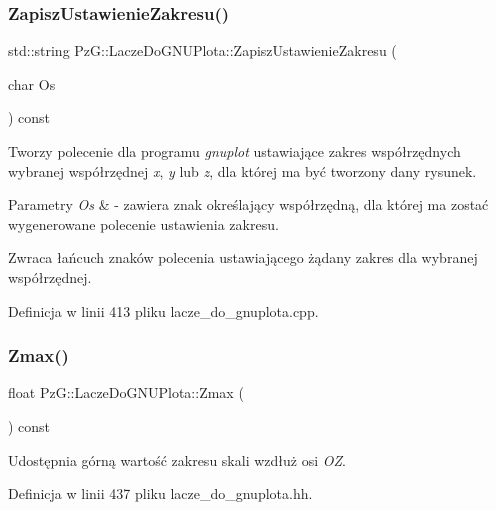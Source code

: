 \subsubsection{\texorpdfstring{ZapiszUstawienieZakresu()}{ZapiszUstawienieZakresu()}}
{\footnotesize\ttfamily std\+::string Pz\+G\+::\+Lacze\+Do\+G\+N\+U\+Plota\+::\+Zapisz\+Ustawienie\+Zakresu (\begin{DoxyParamCaption}\item[{char}]{Os }\end{DoxyParamCaption}) const\hspace{0.3cm}{\ttfamily [protected]}}

Tworzy polecenie dla programu {\itshape gnuplot} ustawiające zakres współrzędnych wybranej współrzędnej {\itshape x}, {\itshape y} lub {\itshape z}, dla której ma być tworzony dany rysunek. 
\begin{DoxyParams}{Parametry}
{\em Os} & -\/ zawiera znak określający współrzędną, dla której ma zostać wygenerowane polecenie ustawienia zakresu. \\
\hline
\end{DoxyParams}
\begin{DoxyReturn}{Zwraca}
łańcuch znaków polecenia ustawiającego żądany zakres dla wybranej współrzędnej. 
\end{DoxyReturn}


Definicja w linii 413 pliku lacze\+\_\+do\+\_\+gnuplota.\+cpp.

\mbox{\label{class_pz_g_1_1_lacze_do_g_n_u_plota_a20a5d03e1fc19c682032bffc54340f12}} 
\subsubsection{\texorpdfstring{Zmax()}{Zmax()}}
{\footnotesize\ttfamily float Pz\+G\+::\+Lacze\+Do\+G\+N\+U\+Plota\+::\+Zmax (\begin{DoxyParamCaption}{ }\end{DoxyParamCaption}) const\hspace{0.3cm}{\ttfamily [inline]}}

Udostępnia górną wartość zakresu skali wzdłuż osi {\itshape OZ}. 

Definicja w linii 437 pliku lacze\+\_\+do\+\_\+gnuplota.\+hh.

\mbox{\label{class_pz_g_1_1_lacze_do_g_n_u_plota_a10950349b348fd3a3d4143e95337527c}} 
